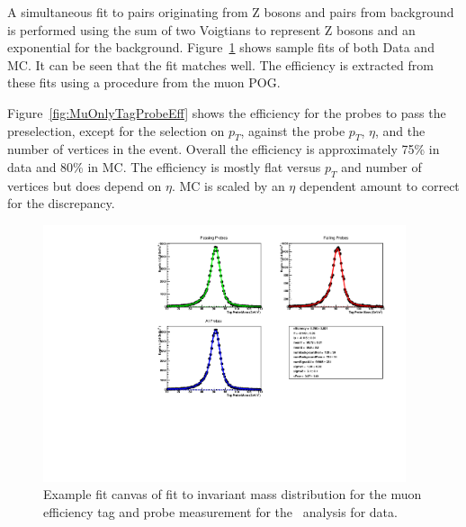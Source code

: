 A simultaneous fit to pairs originating from Z bosons and pairs from background is performed using the
sum of two Voigtians to represent Z bosons and an exponential for the background.
Figure~\ref{fig:MuOnlyTagProbeFit} shows sample fits of
both Data and MC. It can be seen that the fit matches well. The efficiency is extracted from these fits using a procedure from the muon POG.

Figure~\ref{fig:MuOnlyTagProbeEff} shows the efficiency for the probes
to pass the preselection, except for the selection on $p_T$, against the probe
$p_T$, $\eta$, and the number of vertices in the event.
Overall the efficiency is approximately 75\% in data and 80\% in MC.
The efficiency is mostly flat versus $p_T$ and number of vertices but does depend
on $\eta$.  MC is scaled by an $\eta$ dependent amount to correct for the discrepancy.

\begin{figure}
 \begin{center}
  \includegraphics[width=0.95\textwidth]{figures/muonly/FitCanvasDataPtBin0}
 \end{center}
 \caption{Example fit canvas of fit to invariant mass distribution for
the muon efficiency tag and probe measurement for the \muononly\ analysis for data.
    \label{fig:MuOnlyTagProbeFit}}
\end{figure}

